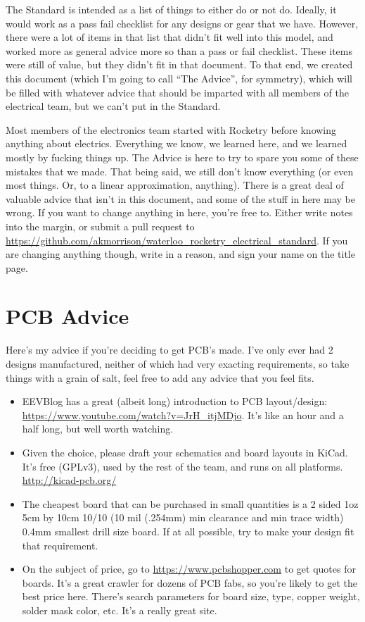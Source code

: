 \documentclass{article}
\begin{document}
The Standard is intended as a list of things to either do or not do. Ideally, it would work as a pass fail checklist for any designs or gear that we have. However, there were a lot of items in that list that didn't fit well into this model, and worked more as general advice more so than a pass or fail checklist. These items were still of value, but they didn't fit in that document. To that end, we created this document (which I'm going to call ``The Advice'', for symmetry), which will be filled with whatever advice that should be imparted with all members of the electrical team, but we can't put in the Standard.

Most members of the electronics team started with Rocketry before knowing anything about electrics. Everything we know, we learned here, and we learned mostly by fucking things up. The Advice is here to try to spare you some of these mistakes that we made. That being said, we still don't know everything (or even most things. Or, to a linear approximation, anything). There is a great deal of valuable advice that isn't in this document, and some of the stuff in here may be wrong. If you want to change anything in here, you're free to. Either write notes into the margin, or submit a pull request to \url{https://github.com/akmorrison/waterloo_rocketry_electrical_standard}. If you are changing anything though, write in a reason, and sign your name on the title page.

\section{PCB Advice}
Here's my advice if you're deciding to get PCB's made. I've only ever had 2 designs manufactured, neither of which had very exacting requirements, so take things with a grain of salt, feel free to add any advice that you feel fits.
\begin{itemize}
\item EEVBlog has a great (albeit long) introduction to PCB layout/design: \url{https://www.youtube.com/watch?v=JrH_itjMDjo}. It's like an hour and a half long, but well worth watching.
\item Given the choice, please draft your schematics and board layouts in KiCad. It's free (GPLv3), used by the rest of the team, and runs on all platforms. \url{http://kicad-pcb.org/}
\item The cheapest board that can be purchased in small quantities is a 2 sided 1oz 5cm by 10cm 10/10 (10 mil (.254mm) min clearance and min trace width) 0.4mm smallest drill size board. If at all possible, try to make your design fit that requirement.
\item On the subject of price, go to \url{https://www.pcbshopper.com} to get quotes for boards. It's a great crawler for dozens of PCB fabs, so you're likely to get the best price here. There's search parameters for board size, type, copper weight, solder mask color, etc. It's a really great site.
\end{itemize}
\end{document}
